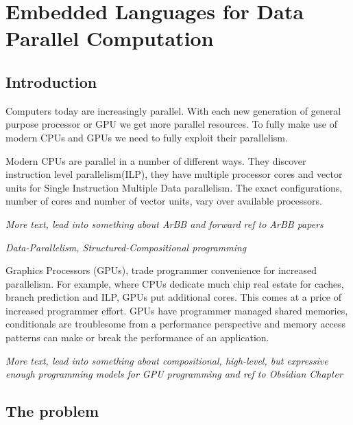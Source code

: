 \documentclass[a4paper]{book}
\newcommand{\thesistitle}{Embedded Languages for Data Parallel Computation}
\begin{document}
\chapter{\thesistitle}

\section{Introduction} 

Computers today are increasingly parallel. With each new generation of 
general purpose processor or GPU we get more parallel resources. To 
fully make use of modern CPUs and GPUs we need to fully exploit their 
parallelism. 

Modern CPUs are parallel in a number of different ways. They discover instruction
level parallelism(ILP), they have multiple processor cores and vector units for 
Single Instruction Multiple Data parallelism. The exact configurations, number
of cores and number of vector units, vary over available processors. 

\noindent\emph{More text, lead into something about ArBB and forward ref to ArBB papers}

\noindent\emph{Data-Parallelism, Structured-Compositional programming} 

Graphics Processors (GPUs), trade programmer convenience for increased parallelism. 
For example, where CPUs dedicate much chip real estate for caches, branch prediction and 
ILP, GPUs put additional cores. This comes at a price of increased programmer effort.
GPUs have programmer managed shared memories, conditionals are troublesome from a performance 
perspective and memory access patterns can make or break the performance of an 
application.  

\noindent\emph{More text, lead into something about compositional, high-level, but 
expressive enough programming models for GPU programming and ref to Obsidian Chapter} 




\section{The problem}
\end{document}
